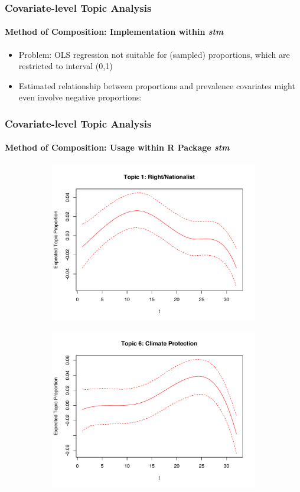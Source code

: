 \documentclass[xcolor=dvipsnames]{beamer}
\begin{document}
\begin{frame}
\frametitle{Covariate-level Topic Analysis}
\framesubtitle{Method of Composition: Implementation within \textit{stm}}
\begin{itemize}
\item Problem: OLS regression not suitable for (sampled) proportions, which are restricted to interval (0,1)
\item Estimated relationship between proportions and prevalence covariates might even involve negative proportions:
\end{itemize}
\frametitle{Covariate-level Topic Analysis}
\framesubtitle{Method of Composition: Usage within R Package \textit{stm}}
  \begin{figure}[h!]
  \centering
  \captionsetup{justification=centering,margin=2cm}
  \begin{subfigure}[b]{0.4\linewidth}
    \includegraphics[width=\linewidth]{../plots/presentation/estEffect_topic1.pdf}
  \end{subfigure}
  \begin{subfigure}[b]{0.4\linewidth}
    \includegraphics[width=\linewidth]{../plots/presentation/estEffect_topic6.pdf}
  \end{subfigure}
\end{figure}
\end{frame}
\end{document}
